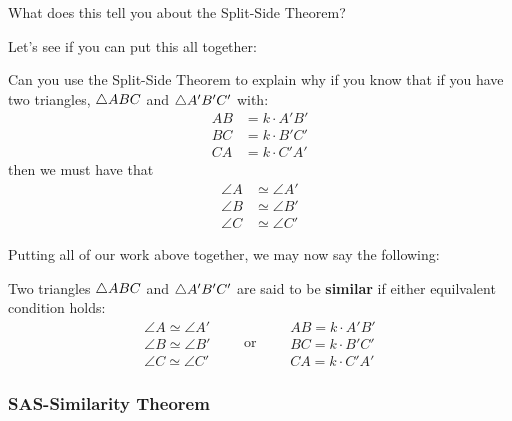 \begin{question} 
What does this tell you about the Split-Side Theorem?
\end{question}
\QM




Let's see if you can put this all together:
\begin{question}
Can you use the Split-Side Theorem to explain why if you know that
if you have two triangles, $\triangle ABC$ and $\triangle A'B'C'$ with:
\begin{align*}
AB &= k\cdot A'B'\\
BC &= k\cdot B'C'\\
CA &= k\cdot C'A'
\end{align*}
then we must have that
\begin{align*}
\angle A &\simeq \angle A'\\
\angle B &\simeq \angle B' \\
\angle C &\simeq \angle C'
\end{align*}
\end{question}
\QM

Putting all of our work above together, we may now say the following:





\begin{definition} 
Two triangles $\triangle ABC$ and $\triangle A'B'C'$ are said to be
\textbf{similar} if either equilvalent condition holds:
\[
\begin{array}{l}
\angle A \simeq \angle A'\\
\angle B \simeq \angle B' \\
\angle C \simeq \angle C'
\end{array}
\qquad\text{or}\qquad
\begin{array}{l}
AB = k\cdot A'B'\\
BC = k\cdot B'C' \\
CA = k\cdot C'A'
\end{array}
\]
\end{definition}



\subsubsection{SAS-Similarity Theorem}








